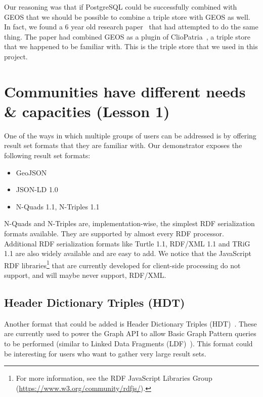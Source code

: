 \documentclass[a4paper]{scrartcl}
\begin{document}
Our reasoning was that if PostgreSQL could be successfully combined
with GEOS that we should be possible to combine a triple store with
GEOS as well.  In fact, we found a 6 year old research
paper~\cite{VanHage2010} that had attempted to do the same thing.  The
paper had combined GEOS as a plugin of
ClioPatria~\cite{Wielemaker2015}, a triple store that we happened to
be familiar with.  This is the triple store that we used in this
project.



\section{Communities have different needs \& capacities (Lesson 1)}
\label{sec:result_set_formats}

One of the ways in which multiple groups of users can be addressed is
by offering result set formats that they are familiar with.  Our
demonstrator exposes the following result set formats:

\begin{itemize}

\item GeoJSON

\item JSON-LD 1.0

\item N-Quads 1.1, N-Triples 1.1

\end{itemize}

N-Quads and N-Triples are, implementation-wise, the simplest RDF
serialization formats available.  They are supported by almost every
RDF processor.  Additional RDF serialization formats like Turtle 1.1,
RDF/XML 1.1 and TRiG 1.1 are also widely available and are easy to
add.  We notice that the JavaScript RDF libraries\footnote{For more
  information, see the RDF JavaScript Libraries Group
  (\url{https://www.w3.org/community/rdfjs/}).} that are currently
developed for client-side processing do not support, and will maybe
never support, RDF/XML.


\subsection{Header Dictionary Triples (HDT)}
\label{sec:hdt}

Another format that could be added is Header Dictionary Triples
(HDT)~\cite{Fernandez2013}.  These are currently used to power the
Graph API to allow Basic Graph Pattern queries to be performed
(similar to Linked Data Fragments (LDF)~\cite{Verborgh2014}).  This
format could be interesting for users who want to gather very large
result sets.
\end{document}
